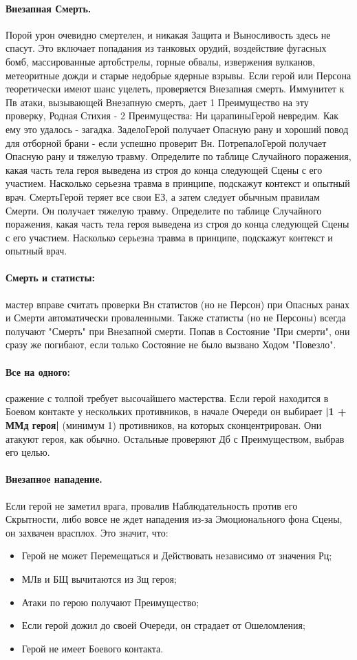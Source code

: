 \paragraph{Внезапная Смерть.} Порой урон очевидно смертелен, и никакая Защита и Выносливость здесь не спасут. Это включает попадания из танковых орудий, воздействие фугасных бомб, массированные артобстрелы, горные обвалы, извержения вулканов, метеоритные дожди и старые недобрые ядерные взрывы.
\newline Если герой или Персона теоретически имеют шанс уцелеть, проверяется  Внезапная смерть. Иммунитет к Пв атаки, вызывающей Внезапную смерть, дает 1 Преимущество на эту проверку, Родная Стихия - 2 Преимущества:
\trouble
{Ни царапины}{Герой невредим. Как ему это удалось - загадка.}
{Задело}{Герой получает Опасную рану и хороший повод для отборной брани - если успешно проверит Вн.}
{Потрепало}{Герой получает Опасную рану и тяжелую травму. Определите по таблице Случайного поражения, какая часть тела героя выведена из строя до конца следующей Сцены с его участием. Насколько серьезна травма в принципе, подскажут контекст и опытный врач.}
{Смерть}{Герой теряет все свои ЕЗ, а затем следует обычным правилам Смерти. Он получает тяжелую травму. Определите по таблице Случайного поражения, какая часть тела героя выведена из строя до конца следующей Сцены с его участием. Насколько серьезна травма в принципе, подскажут контекст и опытный врач.}
\paragraph{Смерть и статисты:} мастер вправе считать проверки Вн статистов (но не Персон) при Опасных ранах и Смерти автоматически проваленными. Также статисты (но не Персоны) всегда получают "Смерть" при Внезапной смерти. Попав в Состояние "При смерти", они сразу же погибают, если только Состояние не было вызвано Ходом "Повезло".
\paragraph{Все на одного:} сражение с толпой требует высочайшего мастерства. Если герой находится в Боевом контакте у нескольких противников, в начале Очереди он выбирает \textbf{|1 + ММд героя|} (минимум 1) противников, на которых сконцентрирован. Они атакуют героя, как обычно. Остальные проверяют Дб с Преимуществом, выбрав его целью.
\paragraph{Внезапное нападение.} Если герой не заметил врага, провалив Наблюдательность против его Скрытности, либо вовсе не ждет нападения из-за Эмоционального фона Сцены, он захвачен врасплох. Это значит, что:
\begin{itemize}
  \item Герой не может Перемещаться и Действовать независимо от значения Рц;
  \item МЛв и БЩ вычитаются из Зщ героя;
  \item Атаки по герою получают Преимущество;
  \item Если герой дожил до своей Очереди, он страдает от Ошеломления;
  \item Герой не имеет Боевого контакта.
\end{itemize}
